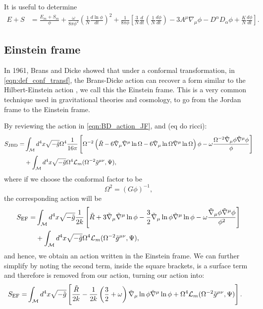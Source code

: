 It is useful to determine
\begin{align}
    E+S&=\frac{E_m+S_m}{\phi}+\frac{\omega}{8\pi \phi^2}\left(\frac{1}{N}\frac{d\ln\phi}{dt}\right)^2+\frac{1}{8\pi \phi}\left[\frac{3}{N}\frac{d}{dt}\left(\frac{1}{N}\frac{d\phi}{dt}\right)-3A^\mu\nabla_\mu\phi-D^\alpha D_\alpha\phi+\frac{K}{N}\frac{d\phi}{dt}\right].
    \label{eqn:raych_useful}
\end{align}



\subsection{Einstein frame}

In 1961, Brans and Dicke showed that under a conformal transformation, in \cref{eqn:def_conf_transf}, the Brans-Dicke action can recover a form similar to the Hilbert-Einstein action \cite{Brans_1961}, we call this the Einstein frame. This is a very common technique used in gravitational theories and cosmology, to go from the Jordan frame to the Einstein frame.


By reviewing the action in \cref{eqn:BD_action_JF}, and (eq do ricci):
\begin{align}
    S_{\text{JBD}}=&\int_{\mathcal{M}} d^4x\sqrt{-\Tilde{g}}\Omega^4\frac{1}{16\pi}\left[\Omega^{-2}\left(\Tilde{R}-6\Tilde{\nabla}_\mu\Tilde{\nabla}^\mu\ln\Omega-6\Tilde{\nabla}_\mu\ln\Omega\Tilde{\nabla}^\mu\ln\Omega\right)\phi-\omega \frac{\Omega^{-2}\Tilde{\nabla}_\mu\phi\Tilde{\nabla}^\mu\phi}{\phi}\right]\nonumber\\
    &+\int_{\mathcal{M}} d^4x\sqrt{-\Tilde{g}}\Omega^4\mathcal{L}_m(\Omega^{-2}\Tilde{g}^{\mu\nu},\Psi),
    \label{eqn:bd_ef_1}
\end{align}
where if we choose the conformal factor to be
\begin{equation}
    \Omega^2=(G\phi)^{-1},
\end{equation}
the corresponding action will be
\begin{align}
    S_{\text{EF}}=&\int_{\mathcal{M}} d^4x\sqrt{-\Tilde{g}}\frac{1}{2k}\left[\Tilde{R}+3\Tilde{\nabla}_\mu\Tilde{\nabla}^\mu\ln\phi-\frac{3}{2}\Tilde{\nabla}_\mu\ln\phi\Tilde{\nabla}^\mu\ln\phi-\omega \frac{\Tilde{\nabla}_\mu\phi\Tilde{\nabla}^\mu\phi}{\phi^2}\right]\nonumber\\
    &+\int_{\mathcal{M}} d^4x\sqrt{-\Tilde{g}}\Omega^4\mathcal{L}_m(\Omega^{-2}\Tilde{g}^{\mu\nu},\Psi),
    \label{eqn:bd_ef_2}
\end{align}
and hence, we obtain an action written in the Einstein frame. We can further simplify by noting the second term, inside the square brackets, is a surface term and therefore is removed from our action, turning our action into:
\begin{align}
    S_{\text{EF}}=&\int_{\mathcal{M}} d^4x\sqrt{-\Tilde{g}}\left[\frac{\Tilde{R}}{2k}-\frac{1}{2k}\left(\frac{3}{2}+\omega\right)\Tilde{\nabla}_\mu\ln\phi\Tilde{\nabla}^\mu\ln\phi+\Omega^4\mathcal{L}_m(\Omega^{-2}\Tilde{g}^{\mu\nu},\Psi)\right].
    \label{eqn:bd_ef_3}
\end{align}

